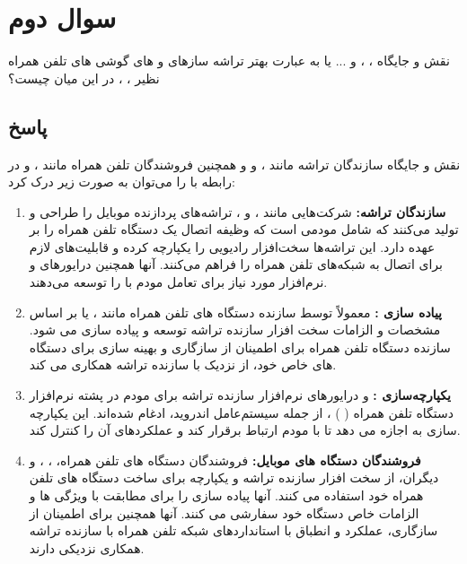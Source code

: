 \documentclass{report}
\begin{document}
   
            
\section*{سوال دوم}
نقش و جایگاه
 ، 
 ،
  و ... یا به عبارت بهتر تراشه سازهای
   و
   های گوشی های تلفن همراه نظیر
    ،
     ،
       در این میان چیست؟

\subsection*{پاسخ}
نقش و جایگاه سازندگان تراشه مانند
، 
و
 و همچنین فروشندگان تلفن همراه مانند
 ،
 و
  در رابطه با 
   را می‌توان به صورت زیر درک کرد:
\begin{enumerate}
	\item 
		\textbf{سازندگان تراشه:} 
		شرکت‌هایی مانند 
		، 
		و
		، تراشه‌های پردازنده موبایل را طراحی و تولید می‌کنند که شامل مودمی است که وظیفه اتصال 
		 یک دستگاه تلفن همراه را بر عهده دارد. این تراشه‌ها سخت‌افزار رادیویی را یکپارچه کرده و قابلیت‌های لازم برای اتصال به شبکه‌های تلفن همراه را فراهم می‌کنند. آنها همچنین درایورهای 
		  و نرم‌افزار مورد نیاز برای تعامل مودم با
		    را توسعه می‌دهند.
	\item 
	\textbf{پیاده سازی
	 :}
	 معمولاً توسط سازنده دستگاه های تلفن همراه مانند 
	 ،
	 یا
	  بر اساس مشخصات و الزامات سخت افزار سازنده تراشه توسعه و پیاده سازی می شود. سازنده دستگاه تلفن همراه برای اطمینان از سازگاری و بهینه سازی 
	   برای دستگاه های خاص خود، از نزدیک با سازنده تراشه همکاری می کند.
	   
	   \item 
	   \textbf{یکپارچه‌سازی
	    :}
	     و درایورهای نرم‌افزار سازنده تراشه برای مودم در پشته نرم‌افزار دستگاه تلفن همراه
	     (
	     )
	     ، از جمله سیستم‌عامل اندروید، ادغام شده‌اند. این یکپارچه سازی به 
	      اجازه می دهد تا با مودم ارتباط برقرار کند و عملکردهای آن را کنترل کند.
\item 
\textbf{فروشندگان دستگاه های موبایل:} 
فروشندگان دستگاه های تلفن همراه، 
،
،
 و دیگران، از سخت افزار سازنده تراشه و 
  یکپارچه برای ساخت دستگاه های تلفن همراه خود استفاده می کنند. آنها پیاده سازی
    را برای مطابقت با ویژگی ها و الزامات خاص دستگاه خود سفارشی می کنند. آنها همچنین برای اطمینان از سازگاری، عملکرد و انطباق با استانداردهای شبکه تلفن همراه با سازنده تراشه همکاری نزدیکی دارند.
\end{enumerate}
\end{document}
